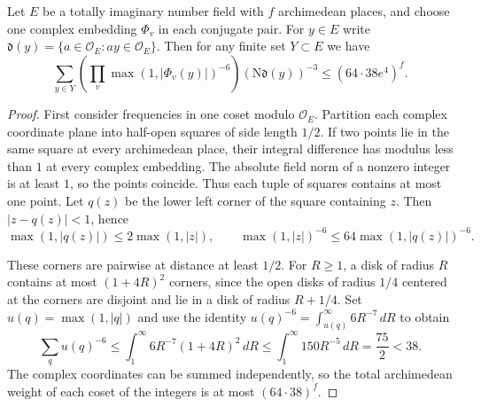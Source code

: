 \begin{lemma}
\label{lem:b-inverse-height-sum}
\emitthmsource
Let $E$ be a totally imaginary number field with $f$ archimedean places, and choose one complex embedding $\Phi_v$ in each conjugate pair.
For $y\in E$ write $\mathfrak d(y)=\{a\in\mathcal O_E:ay\in\mathcal O_E\}$.
Then for any finite set $Y\subset E$ we have
\[
 \sum_{y\in Y}
  \left(\prod_v\max(1,|\Phi_v(y)|)^{-6}\right)
        (\mathrm N\mathfrak d(y))^{-3}
 \le (64\cdot38e^4)^f .
\]
\end{lemma}
\begin{proof}
First consider frequencies in one coset modulo $\mathcal O_E$.
Partition each complex coordinate plane into half-open squares of side length $1/2$.
If two points lie in the same square at every archimedean place, their integral difference has modulus less than $1$ at every complex embedding.
The absolute field norm of a nonzero integer is at least $1$, so the points coincide. Thus each tuple of squares contains at most one point.
Let $q(z)$ be the lower left corner of the square containing $z$. Then $|z-q(z)|<1$, hence
\[
 \max(1,|q(z)|)\le 2\max(1,|z|),\qquad
 \max(1,|z|)^{-6}\le64\max(1,|q(z)|)^{-6}.
\]

These corners are pairwise at distance at least $1/2$.
For $R\ge1$, a disk of radius $R$ contains at most $(1+4R)^2$ corners,
since the open disks of radius $1/4$ centered at the corners are disjoint and lie in a disk of radius $R+1/4$.
Set $u(q)=\max(1,|q|)$ and use the identity
$u(q)^{-6}=\int_{u(q)}^\infty 6R^{-7}\,dR$ to obtain
\[
 \sum_q u(q)^{-6}\le
 \int_1^\infty 6R^{-7}(1+4R)^2\,dR
 \le \int_1^\infty 150R^{-5}\,dR=\frac{75}{2}<38.
\]
The complex coordinates can be summed independently, so the total archimedean weight of each coset of the integers is at most $(64\cdot38)^f$.


\end{proof}
